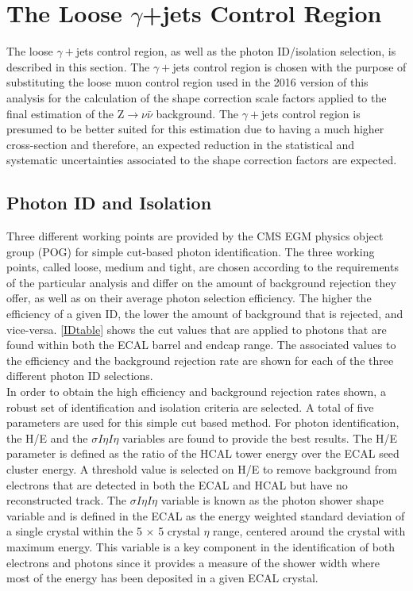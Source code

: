 \section{The Loose $\gamma$+jets Control Region}

The loose $\gamma+$jets control region, as well as the photon ID/isolation selection, is described in this section. The $\gamma+$jets control region is chosen with the purpose of substituting the loose muon control region used in the 2016 version of this analysis for the calculation of the shape correction scale factors applied to the final estimation of the Z$\rightarrow\nu\bar{\nu}$ background. The $\gamma+$jets control region is presumed to be better suited for this estimation due to having a much higher cross-section and therefore, an expected reduction in the statistical and systematic uncertainties associated to the shape correction factors are expected.

\subsection{Photon ID and Isolation}\label{photonID}

Three different working points are provided by the CMS EGM physics object group (POG) for simple cut-based photon identification\cite{photonID}. The three working points, called loose, medium and tight, are chosen according to the requirements of the particular analysis and differ on the amount of background rejection they offer, as well as on their average photon selection efficiency. The higher the efficiency of a given ID, the lower the amount of background that is rejected, and vice-versa. \autoref{IDtable} shows the cut values that are applied to photons that are found within both the ECAL barrel and endcap range. The associated values to the efficiency and the background rejection rate are shown for each of the three different photon ID selections.\\

In order to obtain the high efficiency and background rejection rates shown, a robust set of identification and isolation criteria are selected. A total of five parameters are used for this simple cut based method. For photon identification, the H/E and the $\sigma I\eta I\eta$ variables are found to provide the best results. The H/E parameter is defined as the ratio of the HCAL tower energy over the ECAL seed cluster energy. A threshold value is selected on H/E to remove background from electrons that are detected in both the ECAL and HCAL but have no reconstructed track\cite{egamma}. The $\sigma I\eta I\eta$ variable is known as the photon shower shape variable and is defined in the ECAL as the energy weighted standard deviation of a single crystal within the 5 $\times$ 5 crystal $\eta$ range, centered around the crystal with maximum energy\cite{showershape}. This variable is a key component in the identification of both electrons and photons since it provides a measure of the shower width where most of the energy has been deposited in a given ECAL crystal.

